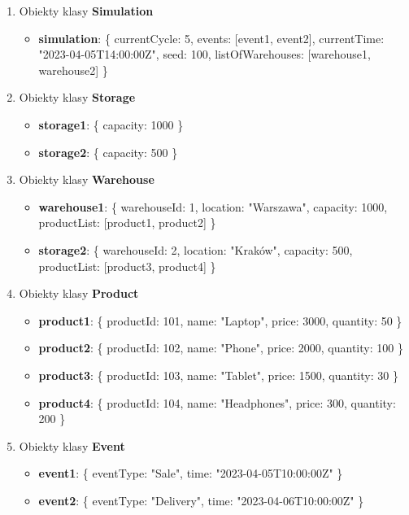 \documentclass[11pt]{article}
\begin{document}
\begin{enumerate}

\item Obiekty klasy \textbf{Simulation}
\begin{itemize}
    \item \textbf{simulation}: \{ currentCycle: 5, events: [event1, event2], currentTime: "2023-04-05T14:00:00Z", seed: 100, listOfWarehouses: [warehouse1, warehouse2] \}
\end{itemize}

\item Obiekty klasy \textbf{Storage}
\begin{itemize}
    \item \textbf{storage1}: \{ capacity: 1000 \}
    \item \textbf{storage2}: \{ capacity: 500 \}
\end{itemize}

\item Obiekty klasy \textbf{Warehouse}
\begin{itemize}
    \item \textbf{warehouse1}: \{ warehouseId: 1, location: "Warszawa", capacity: 1000, productList: [product1, product2] \}
    \item \textbf{storage2}: \{ warehouseId: 2, location: "Kraków", capacity: 500, productList: [product3, product4] \}
\end{itemize}

\item Obiekty klasy \textbf{Product}
\begin{itemize}
    \item \textbf{product1}: \{ productId: 101, name: "Laptop", price: 3000, quantity: 50 \}
    \item \textbf{product2}: \{ productId: 102, name: "Phone", price: 2000, quantity: 100 \}
    \item \textbf{product3}: \{ productId: 103, name: "Tablet", price: 1500, quantity: 30 \}
    \item \textbf{product4}: \{ productId: 104, name: "Headphones", price: 300, quantity: 200 \}
\end{itemize}

\item Obiekty klasy \textbf{Event}
\begin{itemize}
    \item \textbf{event1}: \{ eventType: "Sale", time: "2023-04-05T10:00:00Z" \}
    \item \textbf{event2}: \{ eventType: "Delivery", time: "2023-04-06T10:00:00Z" \}
\end{itemize}


\end{enumerate}
\end{document}
